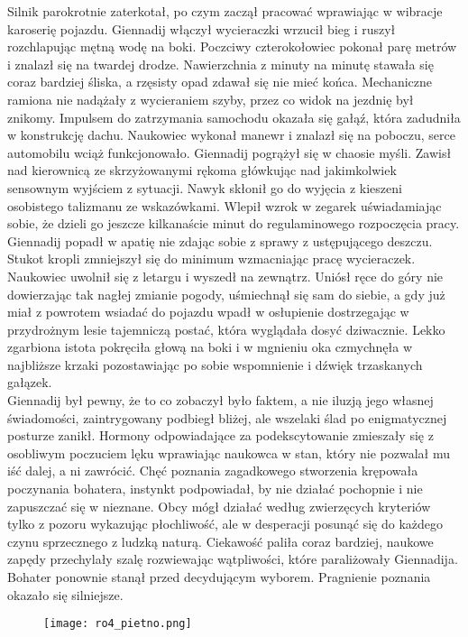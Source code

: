 \documentclass[../MAIN.tex]{subfiles}
\begin{document}
Silnik parokrotnie zaterkotał, po czym zaczął pracować wprawiając w wibracje karoserię pojazdu. Giennadij włączył wycieraczki wrzucił bieg i ruszył rozchlapując mętną wodę na boki. Poczciwy czterokołowiec pokonał parę metrów i znalazł się na twardej drodze. Nawierzchnia z minuty na minutę stawała się coraz bardziej śliska, a rzęsisty opad zdawał się nie mieć końca. Mechaniczne ramiona nie nadążały z wycieraniem szyby, przez co widok na jezdnię był znikomy. Impulsem do zatrzymania samochodu okazała się gałąź, która zadudniła w konstrukcję dachu. Naukowiec wykonał manewr i znalazł się na poboczu, serce automobilu wciąż funkcjonowało. Giennadij pogrążył się w chaosie myśli. Zawisł nad kierownicą ze skrzyżowanymi rękoma główkując nad jakimkolwiek sensownym wyjściem z sytuacji. Nawyk skłonił go do wyjęcia z kieszeni osobistego talizmanu ze wskazówkami. Wlepił wzrok w zegarek uświadamiając sobie, że dzieli go jeszcze kilkanaście minut do regulaminowego rozpoczęcia pracy. Giennadij popadł w apatię nie zdając sobie z sprawy z ustępującego deszczu. Stukot kropli zmniejszył się do minimum wzmacniając pracę wycieraczek. Naukowiec uwolnił się z letargu i wyszedł na zewnątrz. Uniósł ręce do góry nie dowierzając tak nagłej zmianie pogody, uśmiechnął się sam do siebie, a gdy już miał z powrotem wsiadać do pojazdu wpadł w osłupienie dostrzegając w przydrożnym lesie tajemniczą postać, która wyglądała dosyć dziwacznie. Lekko zgarbiona istota pokręciła głową na boki i w mgnieniu oka czmychnęła w najbliższe krzaki pozostawiając po sobie wspomnienie i dźwięk trzaskanych gałązek.\\ 
Giennadij był pewny, że to co zobaczył było faktem, a nie iluzją jego własnej świadomości, zaintrygowany podbiegł bliżej, ale wszelaki ślad po enigmatycznej posturze zanikł. Hormony odpowiadające za podekscytowanie zmieszały się z osobliwym poczuciem lęku wprawiając naukowca w stan, który nie pozwalał mu iść dalej, a ni zawrócić. Chęć poznania zagadkowego stworzenia krępowała poczynania bohatera, instynkt podpowiadał, by nie działać pochopnie i nie zapuszczać się w nieznane. Obcy mógł działać według zwierzęcych kryteriów tylko z pozoru wykazując płochliwość, ale w desperacji posunąć się do każdego czynu sprzecznego z ludzką naturą. Ciekawość paliła coraz bardziej, naukowe zapędy przechylały szalę rozwiewając wątpliwości, które paraliżowały Giennadija. Bohater ponownie stanął przed decydującym wyborem. Pragnienie poznania okazało się silniejsze.
% 
% 
\begin{figure}[ht]
\center
\texttt{[image: ro4\_pietno.png]}
\end{figure}
\end{document}

